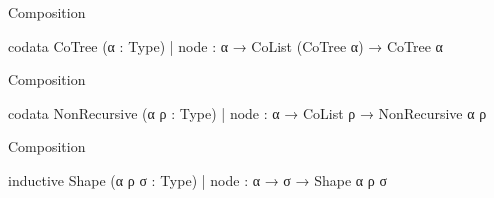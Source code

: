 \documentclass[t,12pt]{beamer}
\begin{document}


\begin{frame}[fragile]{Composition}

\vfill


    \begin{leancode}
codata CoTree (α : Type)
  | node : α → CoList (CoTree α) → CoTree α
    \end{leancode}

    \vfill
    
\end{frame}


\begin{frame}[fragile]{Composition}

\vfill


    \begin{leancode}
codata NonRecursive (α ρ : Type)
  | node : α → CoList ρ → NonRecursive α ρ
    \end{leancode}

    \vfill
    
\end{frame}


\begin{frame}[fragile]{Composition}

\vfill

\begin{leancode}
inductive Shape (α ρ σ : Type)
  | node : α → σ → Shape α ρ σ
\end{leancode}

    \vfill

    \begin{center}
    \end{center}
        

    \vfill

    
\end{frame}
\end{document}

